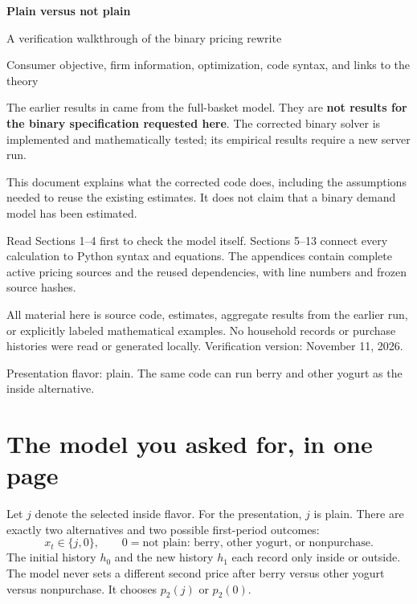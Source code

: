 \documentclass[11pt]{article}
\newcommand{\code}[1]{\texttt{\detokenize{#1}}}
\newcommand{\important}[1]{\begin{tcolorbox}[colback=white,colframe=warning]#1\end{tcolorbox}}
\begin{document}
\begin{titlepage}
\vspace*{.7in}
{\Huge\bfseries Plain versus not plain\par}
\vspace{.2in}
{\LARGE A verification walkthrough of the binary pricing rewrite\par}
\vspace{.3in}
{\large Consumer objective, firm information, optimization, code syntax, and links to the theory\par}
\vspace{.4in}
\important{The earlier results in \code{new_pricing_res/} came from the full-basket model. They are \textbf{not results for the binary specification requested here}. The corrected binary solver is implemented and mathematically tested; its empirical results require a new server run.}
This document explains what the corrected code does, including the assumptions needed to reuse the existing estimates. It does not claim that a binary demand model has been estimated.

Read Sections 1--4 first to check the model itself. Sections 5--13 connect every calculation to Python syntax and equations. The appendices contain complete active pricing sources and the reused dependencies, with line numbers and frozen source hashes.

All material here is source code, estimates, aggregate results from the earlier run, or explicitly labeled mathematical examples. No household records or purchase histories were read or generated locally.
\vfill
Verification version: November 11, 2026.\par
Presentation flavor: plain. The same code can run berry and other yogurt as the inside alternative.
\end{titlepage}
\tableofcontents\clearpage

\section{The model you asked for, in one page}
Let $j$ denote the selected inside flavor. For the presentation, $j$ is plain. There are exactly two alternatives and two possible first-period outcomes:
\[
 x_t\in\{j,0\},\qquad 0=\text{not plain: berry, other yogurt, or nonpurchase}.
\]
The initial history $h_0$ and the new history $h_1$ each record only inside or outside. The model never sets a different second price after berry versus other yogurt versus nonpurchase. It chooses $p_2(j)$ or $p_2(0)$.
\end{document}
